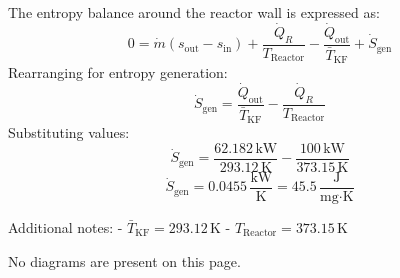 The entropy balance around the reactor wall is expressed as:  
\[
0 = \dot{m} (s_{\text{out}} - s_{\text{in}}) + \frac{\dot{Q}_R}{T_{\text{Reactor}}} - \frac{\dot{Q}_{\text{out}}}{\bar{T}_{\text{KF}}} + \dot{S}_{\text{gen}}
\]  
Rearranging for entropy generation:  
\[
\dot{S}_{\text{gen}} = \frac{\dot{Q}_{\text{out}}}{\bar{T}_{\text{KF}}} - \frac{\dot{Q}_R}{T_{\text{Reactor}}}
\]  
Substituting values:  
\[
\dot{S}_{\text{gen}} = \frac{62.182 \, \text{kW}}{293.12 \, \text{K}} - \frac{100 \, \text{kW}}{373.15 \, \text{K}}
\]  
\[
\dot{S}_{\text{gen}} = 0.0455 \, \frac{\text{kW}}{\text{K}} = 45.5 \, \frac{\text{J}}{\text{mg·K}}
\]  

Additional notes:  
- \( \bar{T}_{\text{KF}} = 293.12 \, \text{K} \)  
- \( T_{\text{Reactor}} = 373.15 \, \text{K} \)  

No diagrams are present on this page.